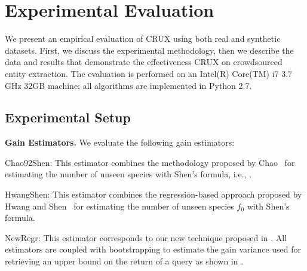 

\section{Experimental Evaluation}
\label{sec:exps}
We present an empirical evaluation of CRUX using both real and synthetic datasets. First, we discuss the experimental methodology, then we describe the data and results that demonstrate the effectiveness CRUX on crowdsourced entity extraction. The evaluation is performed on an Intel(R) Core(TM) i7 3.7 GHz 32GB machine; all algorithms are implemented in Python 2.7. 

\subsection{Experimental Setup}
\label{sec:expsetup}
\vspace{5pt}\noindent\textbf{Gain Estimators.} We evaluate the following gain estimators:
\squishlist
\item Chao92Shen: This estimator combines the methodology proposed by Chao~\cite{chao:1992} for estimating the number of unseen species  with Shen's formula, i.e., .
\item HwangShen: This estimator combines the regression-based approach proposed by Hwang and Shen~\cite{hwang:2010} for estimating the number of unseen species $f_0$ with Shen's formula. 
\item NewRegr: This estimator corresponds to our new technique proposed in .
\squishend
All estimators are coupled with bootstrapping to estimate the gain variance used for retrieving an upper bound on the return of a query as shown in .

